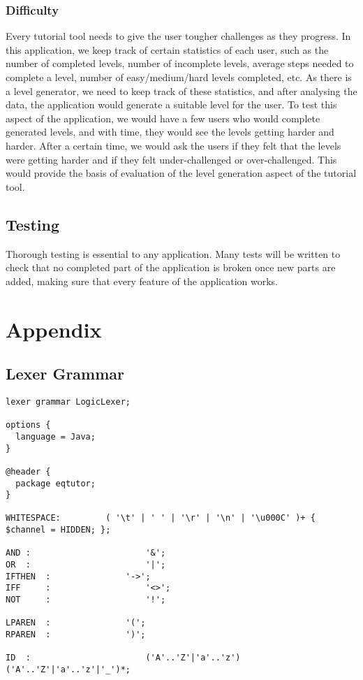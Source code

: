 \documentclass[12pt]{article}
\begin{document}
\subsubsection{Difficulty}
Every tutorial tool needs to give the user tougher challenges as they progress.
In this application, we keep track of certain statistics of each user, such as
the number of completed levels, number of incomplete levels, average steps needed
to complete a level, number of easy/medium/hard levels completed, etc. 
As there is a level generator, we need to keep track of these statistics, and
after analysing the data, the application would generate a suitable level for the
user.
To test this aspect of the application, we would have a few users who would complete
generated levels, and with time, they would see the levels getting harder and harder.
After a certain time, we would ask the users if they felt that the levels were getting
harder and if they felt under-challenged or over-challenged. This would provide the
basis of evaluation of the level generation aspect of the tutorial tool.

\subsection{Testing}
Thorough testing is essential to any application. Many tests will be written to
check that no completed part of the application is broken once new parts are added,
making sure that every feature of the application works.
\newpage

\section{Appendix}

\subsection{Lexer Grammar}

\begin{verbatim}
lexer grammar LogicLexer;

options {
  language = Java;
}

@header {
  package eqtutor;
}

WHITESPACE:			( '\t' | ' ' | '\r' | '\n' | '\u000C' )+ { $channel = HIDDEN; };

AND	:						'&';
OR	:						'|';
IFTHEN	:				'->';
IFF 	:					'<>';
NOT 	:					'!';

LPAREN  :				'(';
RPAREN  :				')';

ID	:						('A'..'Z'|'a'..'z') ('A'..'Z'|'a'..'z'|'_')*;
\end{verbatim}
\end{document}
